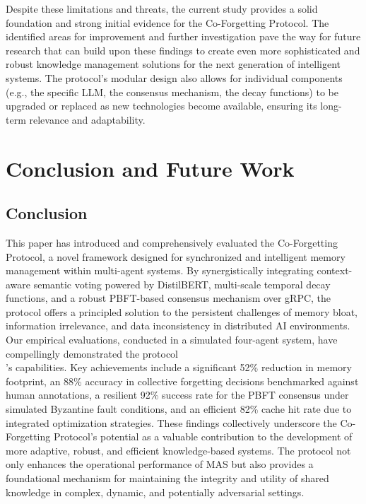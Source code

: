 \documentclass[conference]{IEEEtran}
\begin{document}
Despite these limitations and threats, the current study provides a solid foundation and strong initial evidence for the Co-Forgetting Protocol. The identified areas for improvement and further investigation pave the way for future research that can build upon these findings to create even more sophisticated and robust knowledge management solutions for the next generation of intelligent systems. The protocol’s modular design also allows for individual components (e.g., the specific LLM, the consensus mechanism, the decay functions) to be upgraded or replaced as new technologies become available, ensuring its long-term relevance and adaptability.




\section{Conclusion and Future Work}
\label{sec:conclusion_future_work}

\subsection{Conclusion}
\label{sec:conclusion}

This paper has introduced and comprehensively evaluated the Co-Forgetting Protocol, a novel framework designed for synchronized and intelligent memory management within multi-agent systems. By synergistically integrating context-aware semantic voting powered by DistilBERT, multi-scale temporal decay functions, and a robust PBFT-based consensus mechanism over gRPC, the protocol offers a principled solution to the persistent challenges of memory bloat, information irrelevance, and data inconsistency in distributed AI environments. Our empirical evaluations, conducted in a simulated four-agent system, have compellingly demonstrated the protocol\\'s capabilities. Key achievements include a significant 52\% reduction in memory footprint, an 88\% accuracy in collective forgetting decisions benchmarked against human annotations, a resilient 92\% success rate for the PBFT consensus under simulated Byzantine fault conditions, and an efficient 82\% cache hit rate due to integrated optimization strategies. These findings collectively underscore the Co-Forgetting Protocol’s potential as a valuable contribution to the development of more adaptive, robust, and efficient knowledge-based systems. The protocol not only enhances the operational performance of MAS but also provides a foundational mechanism for maintaining the integrity and utility of shared knowledge in complex, dynamic, and potentially adversarial settings.
\end{document}
